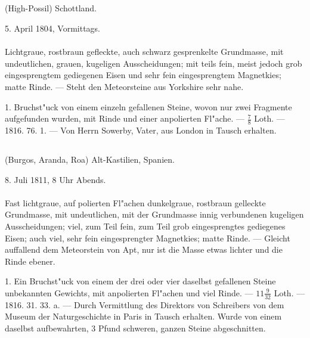 \documentclass[a4paper, 11pt, oneside, polutonikogreek, german]{article}
\begin{document}
\subsection{}
\begin{center}

(High-Possil) Schottland.

5. April 1804, Vormittags.
\end{center}
\paragraph{}
Lichtgraue, rostbraun gefleckte, auch schwarz gesprenkelte Grundmasse, mit undeutlichen, grauen, kugeligen Ausscheidungen; mit teils fein, meist jedoch grob eingesprengtem gediegenen Eisen und sehr fein eingesprengtem Magnetkies; matte Rinde. --- Steht den Meteorsteine aus Yorkshire sehr nahe.

1. Bruchst"uck von einem einzeln gefallenen Steine, wovon nur zwei Fragmente aufgefunden wurden, mit Rinde und einer anpolierten Fl"ache. --- $\frac{7}{8}$ Loth. --- 1816. 76. 1. --- Von Herrn Sowerby, Vater, aus London in Tausch erhalten.
\subsection{}
\begin{center}

(Burgos, Aranda, Roa) Alt-Kastilien, Spanien.

8. Juli 1811, 8 Uhr Abends.
\end{center}
\paragraph{}
Fast lichtgraue, auf polierten Fl"achen dunkelgraue, rostbraun gelleckte Grundmasse, mit undeutlichen, mit der Grundmasse innig verbundenen kugeligen Ausscheidungen; viel, zum Teil fein, zum Teil grob eingesprengtes gediegenes Eisen; auch viel, sehr fein eingesprengter Magnetkies; matte Rinde. --- Gleicht auffallend dem Meteorstein von Apt, nur ist die Masse etwas lichter und die Rinde ebener.

1. Ein Bruchst"uck von einem der drei oder vier daselbst gefallenen Steine unbekannten Gewichts, mit anpolierten Fl"achen und viel Rinde. --- $11\frac{9}{32}$ Loth. --- 1816. 31. 33. a. --- Durch Vermittlung des Direktors von Schreibers von dem Museum der Naturgeschichte in Paris in Tausch erhalten. Wurde von einem daselbst aufbewahrten, 3 Pfund schweren, ganzen Steine abgeschnitten.
\end{document}
